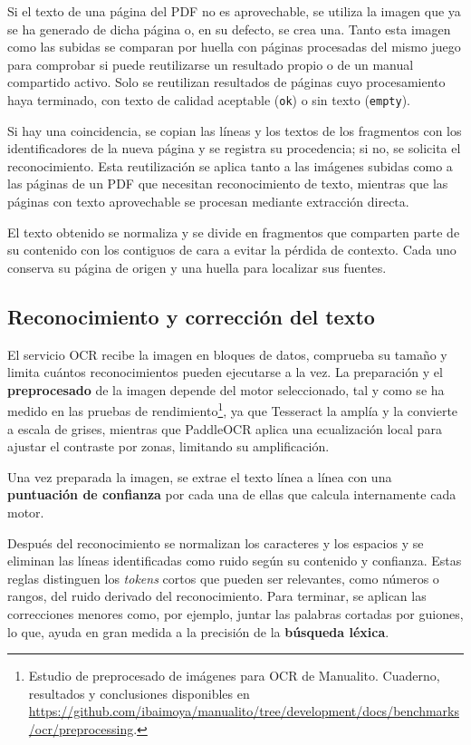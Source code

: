 Si el texto de una página del \acs{PDF} no es aprovechable, se
utiliza la imagen que ya se ha generado de dicha página o, en
su defecto, se crea una. Tanto esta imagen como las subidas se
comparan por huella con páginas procesadas del mismo juego para comprobar
si puede reutilizarse un resultado propio o de un manual compartido activo.
Solo se reutilizan resultados de páginas cuyo procesamiento haya terminado,
con texto de calidad aceptable (\texttt{ok}) o sin texto (\texttt{empty}).

Si hay una coincidencia, se copian las líneas y los textos de los fragmentos
con los identificadores de la nueva página y se registra su procedencia;
si no, se solicita el reconocimiento. Esta reutilización se aplica tanto
a las imágenes subidas como a las páginas de un \acs{PDF} que necesitan
reconocimiento de texto, mientras que las páginas con texto aprovechable
se procesan mediante extracción directa.

El texto obtenido se normaliza y se divide en fragmentos que comparten parte
de su contenido con los contiguos de cara a evitar la pérdida de contexto. Cada uno conserva su página de origen y
una huella para localizar sus fuentes.


\FloatBarrier
\subsection{Reconocimiento y corrección del texto}

El servicio \ac{OCR} recibe la imagen en bloques de datos, comprueba su tamaño y
limita cuántos reconocimientos pueden ejecutarse a la vez. La preparación y el \textbf{preprocesado}
de la imagen depende del motor seleccionado, tal y como se ha medido en las pruebas de rendimiento\footnote{Estudio de preprocesado de imágenes para OCR de Manualito. Cuaderno, resultados y conclusiones disponibles en \url{https://github.com/ibaimoya/manualito/tree/development/docs/benchmarks/ocr/preprocessing}.}, ya que Tesseract la amplía y
la convierte a escala de grises, mientras que PaddleOCR aplica una
ecualización local para ajustar el contraste por zonas, limitando su
amplificación.

Una vez preparada la imagen, se extrae el texto línea a línea
con una \textbf{puntuación de confianza} por cada una de ellas que
calcula internamente cada motor.

Después del reconocimiento se normalizan los caracteres y los espacios
y se eliminan las líneas identificadas como ruido según su contenido y
confianza. Estas reglas distinguen los \textit{tokens} cortos que pueden
ser relevantes, como números o rangos, del ruido derivado del reconocimiento.
Para terminar, se aplican las correcciones menores como, por ejemplo, juntar las palabras cortadas por guiones, lo que,
ayuda en gran medida a la precisión de la \textbf{búsqueda léxica}.

